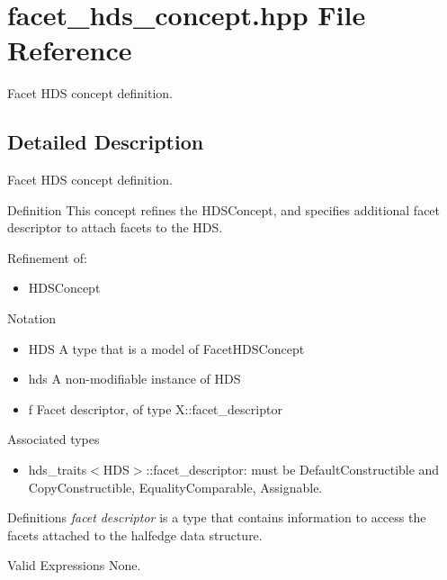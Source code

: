 \section{facet\_\-hds\_\-concept.hpp File Reference}
\label{facet__hds__concept_8hpp}
Facet HDS concept definition. 



\subsection{Detailed Description}
Facet HDS concept definition. 

\begin{Desc}
\item[Definition]This concept refines the HDSConcept, and specifies additional facet descriptor to attach facets to the HDS.\end{Desc}
\begin{Desc}
\item[Refinement of:]\begin{itemize}
\item HDSConcept\end{itemize}
\end{Desc}
\begin{Desc}
\item[Notation]\begin{itemize}
\item HDS A type that is a model of Facet\-HDSConcept\item hds A non-modifiable instance of HDS\item f Facet descriptor, of type X::facet\_\-descriptor\end{itemize}
\end{Desc}
\begin{Desc}
\item[Associated types]\begin{itemize}
\item hds\_\-traits$<$HDS$>$::facet\_\-descriptor: must be Default\-Constructible and Copy\-Constructible, Equality\-Comparable, Assignable.\end{itemize}
\end{Desc}
\begin{Desc}
\item[Definitions]{\em facet\/} {\em descriptor\/} is a type that contains information to access the facets attached to the halfedge data structure.\end{Desc}
\begin{Desc}
\item[Valid Expressions]None.\end{Desc}
